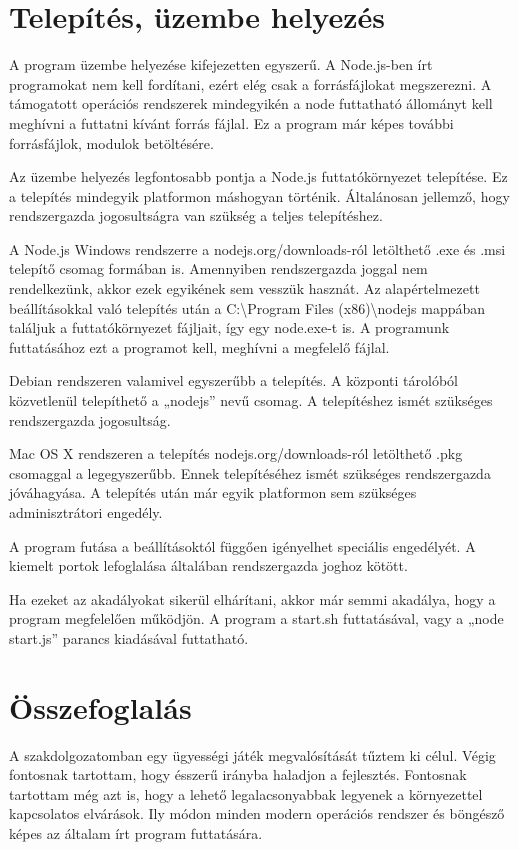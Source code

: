 \documentclass[bibliography=totocnumbered]{article}
\begin{document}
\section{Telepítés, üzembe
helyezés}

A program üzembe helyezése kifejezetten egyszerű. A Node.js-ben írt
programokat nem kell fordítani, ezért elég csak a forrásfájlokat
megszerezni. A támogatott operációs rendszerek mindegyikén a node
futtatható állományt kell meghívni a futtatni kívánt forrás fájlal. Ez a
program már képes további forrásfájlok, modulok betöltésére.

Az üzembe helyezés legfontosabb pontja a Node.js futtatókörnyezet
telepítése. Ez a telepítés mindegyik platformon máshogyan történik.
Általánosan jellemző, hogy rendszergazda jogosultságra van szükség a
teljes telepítéshez.

A Node.js Windows rendszerre a nodejs.org/downloads-ról letölthető .exe
és .msi telepítő csomag formában is. Amennyiben rendszergazda joggal nem
rendelkezünk, akkor ezek egyikének sem vesszük hasznát. Az
alapértelmezett beállításokkal való telepítés után a
C:\textbackslash{}Program Files (x86)\textbackslash{}nodejs mappában
találjuk a futtatókörnyezet fájljait, így egy node.exe-t is. A
programunk futtatásához ezt a programot kell, meghívni a megfelelő
fájlal.

Debian rendszeren valamivel egyszerűbb a telepítés. A központi tárolóból
közvetlenül telepíthető a „nodejs'' nevű csomag. A telepítéshez ismét
szükséges rendszergazda jogosultság.

Mac OS X rendszeren a telepítés nodejs.org/downloads-ról letölthető .pkg
csomaggal a legegyszerűbb. Ennek telepítéséhez ismét szükséges
rendszergazda jóváhagyása. A telepítés után már egyik platformon sem
szükséges adminisztrátori engedély.

A program futása a beállításoktól függően igényelhet speciális
engedélyét. A kiemelt portok lefoglalása általában rendszergazda joghoz
kötött.

Ha ezeket az akadályokat sikerül elhárítani, akkor már semmi akadálya,
hogy a program megfelelően működjön. A program a start.sh futtatásával,
vagy a „node start.js'' parancs kiadásával futtatható.


\section{Összefoglalás}

A szakdolgozatomban egy ügyességi játék megvalósítását tűztem ki célul.
Végig fontosnak tartottam, hogy ésszerű irányba haladjon a fejlesztés.
Fontosnak tartottam még azt is, hogy a lehető legalacsonyabbak legyenek
a környezettel kapcsolatos elvárások. Ily módon minden modern operációs
rendszer és böngésző képes az általam írt program futtatására.
\end{document}
